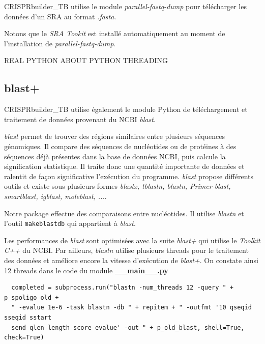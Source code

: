 \documentclass[twoside,a4paper,11pt,frenchb,openany]{report}
\begin{document}
CRISPRbuilder\_TB utilise le module \textit{parallel-fastq-dump} pour télécharger les données d'un SRA au format \textit{.fasta}.

Notons que le \textit{SRA Tookit} est installé automatiquement au moment de l'installation de \textit{parallel-fastq-dump}.



REAL PYTHON ABOUT PYTHON THREADING




\subsection{blast+}

CRISPRbuilder\_TB utilise également le module Python de téléchargement et traitement de données provenant du NCBI \textit{blast}.

\textit{blast} permet de trouver des régions similaires entre plusieurs séquences génomiques.  Il compare des séquences de nucléotides ou de protéines à des séquences déjà présentes dans la base de données NCBI, puis calcule la signification statistique. Il traite donc une quantité importante de données et ralentit de façon significative l'exécution du programme. \textit{blast} propose différents outils et existe sous plusieurs formes \textit{blastx, tblastn, blastn, Primer-blast, smartblast, igblast, moleblast, ...}.

Notre package effectue des comparaisons entre nucléotides. Il utilise \textit{blastn} et l'outil \texttt{makeblastdb} qui appartient à \textit{blast}. 

Les performances de \textit{blast} sont optimisées avec la suite \textit{blast+} qui utilise le \textit{Toolkit C++} du NCBI. Par ailleurs, \textit{blastn} utilise plusieurs threads pour le traitement des données et améliore encore la vitesse d'exécution de \textit{blast+}. On constate ainsi 12 threads dans le code du module \textbf{\_\_main\_\_.py}

\begin{verbatim}
  completed = subprocess.run("blastn -num_threads 12 -query " + p_spoligo_old + 
  " -evalue 1e-6 -task blastn -db " + repitem + " -outfmt '10 qseqid sseqid sstart 
  send qlen length score evalue' -out " + p_old_blast, shell=True, check=True)
\end{verbatim}







\end{document}
